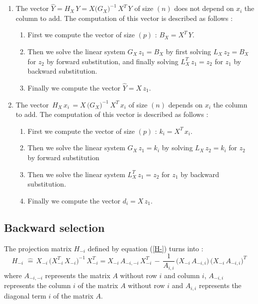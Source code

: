 \begin{enumerate}
\item The vector $\hat{Y}=H_X\,Y=X\big(G_X\big)^{-1}\,X^T\,Y $ of size $(n)$ does not depend on $x_i$ the column to add. 
The computation of this vector is described as follows : 
\begin{enumerate}
\item First we compute the vector of size $(p)$ : $B_X=X^T\,Y$.
\item Then we solve the linear system $G_X \,z_1= B_X$ by first solving $L_X\,z_2= B_X$ for $z_2$ by forward substitution, and finally 
 solving $L_X^T\,z_1=z_2$ for $z_1$ by backward substitution.
\item Finally we compute the vector $\hat{Y}=X\,z_1$.
\end{enumerate}
\item The vector $\,H_X\,x_i\,=X\,\big(G_X\big)^{-1}\,X^T\,x_i$ of size $(n)$ depends on $x_i$ the column to add.  
The computation of this vector is described as follows : 
\begin{enumerate}
\item First we compute the vector of size $(p)$ : $ k_i=X^T\,x_i$.
\item Then we solve the linear system $G_X \,z_1= k_i$ by solving $L_X\,z_2= k_i$ for $z_2$ by forward substitution
\item Then we solve the linear system $L_X^T\,z_1=z_2$ for $z_1$ by backward substitution.
\item Finally we compute the vector $d_i = X\,z_1$.
\end{enumerate}
\end{enumerate}



\newpage
\subsection{Backward selection}
The projection matrix $H_{-i}$ defined by equation (\ref{H-}) turns into :
 \begin{equation}
\label{H2-}
H_{-i}\, \,\hat{=}\, X_{-i}\,\big(X^T_{-i} \,X_{-i}\big)^{-1} \,X^T_{-i}
= X_{-i}\,A_{-i,-i} \, X^T_{-i} \,-\,\frac {1}{A_{i,i}}\,\big(X_{-i}\, A_{-i,i}\big)\, \big(X_{-i}\, A_{-i,i}\big)^T 
 \end{equation}
where $A_{-i,-i}$ represents the matrix $A$ without row $i$ and column $i$,
$A_{-i,i}$ represents the column $i$ of the matrix $A$ without row $i$ and $A_{i,i}$ represents the diagonal term $i$ of the matrix $A$.\\

